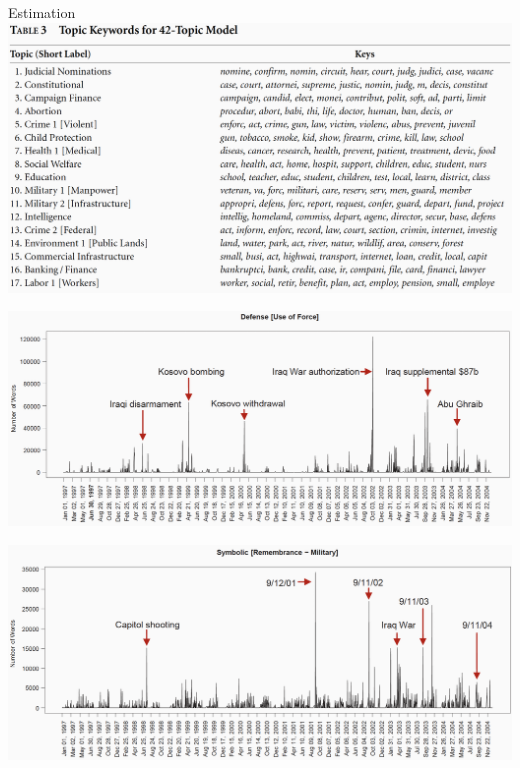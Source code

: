 \documentclass[english]{beamer}
\begin{document}
\begin{frame}{Estimation}
\centering
\includegraphics[width=1 \textwidth]{Images/table_quinn.png}
\end{frame}


\begin{frame}{}
    \centering
\includegraphics[width=1 \textwidth]{Images/use_force.png}
\end{frame}

\begin{frame}{}
    \centering
\includegraphics[width=1 \textwidth]{Images/military.png}
\end{frame}
\end{document}
